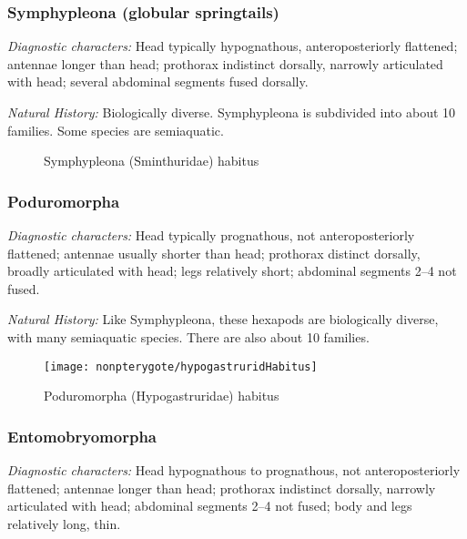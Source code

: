 \subsubsection{Symphypleona (globular springtails)}
\noindent{}\textit{Diagnostic characters:} Head typically hypognathous, anteroposteriorly flattened; antennae longer than head; prothorax indistinct dorsally, narrowly articulated with head; several abdominal segments fused dorsally.\vspace{3mm}

\noindent{}\textit{Natural History:} Biologically diverse. Symphypleona is subdivided into about 10 families. Some species are semiaquatic.\vspace{3mm}

\begin{figure}[ht!]
  \centering
  \caption{Symphypleona (Sminthuridae) habitus \citep[redrawn from][Fig. 19]{bhlitem30465Insects}}
  \label{fig:sminthhab}
\end{figure}

\subsubsection{Poduromorpha}
\noindent{}\textit{Diagnostic characters:} Head typically prognathous, not anteroposteriorly flattened; antennae usually shorter than head; prothorax distinct dorsally, broadly articulated with head; legs relatively short; abdominal segments 2--4 not fused.\vspace{3mm}

\noindent{}\textit{Natural History:} Like Symphypleona, these hexapods are biologically diverse, with many semiaquatic species. There are also about 10 families.\vspace{3mm}

\begin{figure}[ht!]
  \centering
    \texttt{[image: nonpterygote/hypogastruridHabitus]}
  \caption{Poduromorpha (Hypogastruridae) habitus \citep[redrawn from][Fig. 14]{bhlitem30465Insects}}
  \label{fig:hypogasthab}
\end{figure}

\subsubsection{Entomobryomorpha}
\noindent{}\textit{Diagnostic characters:} Head hypognathous to prognathous, not anteroposteriorly flattened; antennae longer than head; prothorax indistinct dorsally, narrowly articulated with head; abdominal segments 2--4 not fused; body and legs relatively long, thin.\vspace{3mm}

